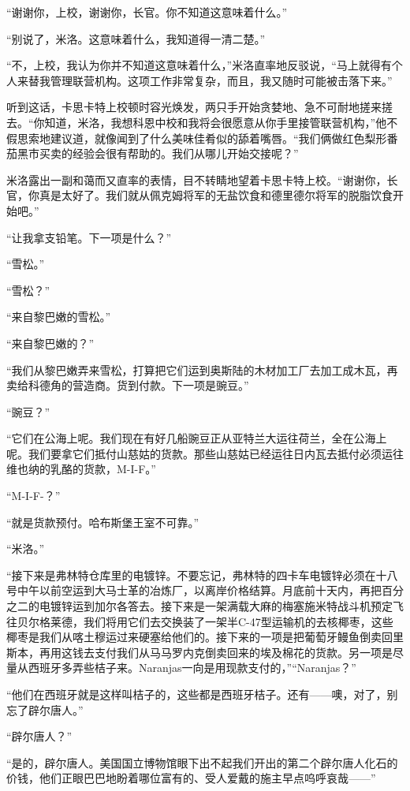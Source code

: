     “谢谢你，上校，谢谢你，长官。你不知道这意味着什么。”

    “别说了，米洛。这意味着什么，我知道得一清二楚。”

    “不，上校，我认为你并不知道这意味着什么，”米洛直率地反驳说，“马上就得有个人来替我管理联营机构。这项工作非常复杂，而且，我又随时可能被击落下来。”

    听到这话，卡思卡特上校顿时容光焕发，两只手开始贪婪地、急不可耐地搓来搓去。“你知道，米洛，我想科恩中校和我将会很愿意从你手里接管联营机构，”他不假思索地建议道，就像闻到了什么美味佳肴似的舔着嘴唇。“我们俩做红色梨形番茄黑市买卖的经验会很有帮助的。我们从哪儿开始交接呢？”
 


    米洛露出一副和蔼而又直率的表情，目不转睛地望着卡思卡特上校。“谢谢你，长官，你真是太好了。我们就从佩克姆将军的无盐饮食和德里德尔将军的脱脂饮食开始吧。”

    “让我拿支铅笔。下一项是什么？”

    “雪松。”

    “雪松？”

    “来自黎巴嫩的雪松。”

    “来自黎巴嫩的？”

    “我们从黎巴嫩弄来雪松，打算把它们运到奥斯陆的木材加工厂去加工成木瓦，再卖给科德角的营造商。货到付款。下一项是豌豆。”

    “豌豆？”

    “它们在公海上呢。我们现在有好几船豌豆正从亚特兰大运往荷兰，全在公海上呢。我们要拿它们抵付山慈姑的货款。那些山慈姑已经运往日内瓦去抵付必须运往维也纳的乳酪的货款，M-I-F。”

    “M-I-F-？”

    “就是货款预付。哈布斯堡王室不可靠。”

    “米洛。”

    “接下来是弗林特仓库里的电镀锌。不要忘记，弗林特的四卡车电镀锌必须在十八号中午以前空运到大马士革的冶炼厂，以离岸价格结算。月底前十天内，再把百分之二的电镀锌运到加尔各答去。接下来是一架满载大麻的梅塞施米特战斗机预定飞往贝尔格莱德，我们将用它们去交换装了一架半C-47型运输机的去核椰枣，这些椰枣是我们从喀土穆运过来硬塞给他们的。接下来的一项是把葡萄牙鳗鱼倒卖回里斯本，再用这钱去支付我们从马马罗内克倒卖回来的埃及棉花的货款。另一项是尽量从西班牙多弄些桔子来。Naranjas一向是用现款支付的，”“Naranjas？”

    “他们在西班牙就是这样叫桔子的，这些都是西班牙桔子。还有——噢，对了，别忘了辟尔唐人。”

    “辟尔唐人？”

    “是的，辟尔唐人。美国国立博物馆眼下出不起我们开出的第二个辟尔唐人化石的价钱，他们正眼巴巴地盼着哪位富有的、受人爱戴的施主早点呜呼哀哉——”

